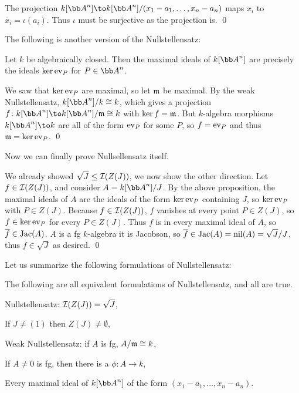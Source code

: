     The projection $k[\bA^n]\to k[\bA^n]/(x_1-a_1,\dots,x_n-a_n)$ maps $x_i$ to $\bar x_i=\iota(a_i)$.
    Thus $\iota$ must be surjective as the projection is.
    \qed

\eproof

The following is another version of the Nullstellensatz:

\bprop

    Let $k$ be algebraically closed.
    Then the maximal ideals of $k[\bA^n]$ are precisely the ideals $\mathop{\rm ker}{\rm ev}_P$ for $P\in\bA^n$.

\eprop

\bproof

    We saw that $\mathop{\rm ker}{\rm ev}_P$ are maximal, so let ${{\frak m}}$ be maximal.
    By the weak Nullstellensatz, $k[\bA^n]/k\cong k$, which gives a projection $f\colon k[\bA^n]\to k[\bA^n]/\m\cong k$ with
    $\mathop{\rm ker} f={{\frak m}}$.
    But $k$-algebra morphisms $k[\bA^n]\to k$ are all of the form ${\rm ev}_P$ for some $P$, so $f={\rm ev}_P$ and thus ${{\frak m}}=\mathop{\rm ker}{\rm ev}_P$.
    \qed

\eproof

Now we can finally prove Nullsellensatz itself.

\bproof[Nullstellensatz]

    We already showed $\sqrt J\leq{{\cal I}}(Z(J))$, we now show the other direction.
    Let $f\in{{\cal I}}(Z(J))$, and consider $A=k[\bA^n]/J$.
    By the above proposition, the maximal ideals of $A$ are the ideals of the form $\mathop{\rm ker}{\rm ev}_P$ containing $J$, so $\mathop{\rm ker}{\rm ev}_P$ with $P\in Z(J)$.
    Because $f\in{{\cal I}}(Z(J))$, $f$ vanishes at every point $P\in Z(J)$, so $f\in\mathop{\rm ker}{\rm ev}_P$ for every $P\in Z(J)$.
    Thus $f$ is in every maximal ideal of $A$, so ${\overline{f}}\in{\rm Jac}(A)$.
    $A$ is a fg $k$-algebra it is Jacobson, so ${\overline{f}}\in{\rm Jac}(A)={\rm nil}(A)=\sqrt J/J$, thus $f\in\sqrt J$ as desired.
    \qed

\eproof

Let us summarize the following formulations of Nullstellensatz:

\bthrm[title=Equivalent formulations of Nullstellensatz]

    The following are all equivalent formulations of Nullstellensatz, and all are true.
    \benum
        \item Nullstellensatz: ${{\cal I}}(Z(J))=\sqrt J$,
        \item If $J\neq(1)$ then $Z(J)\neq\emptyset$,
        \item Weak Nullstellensatz: if $A$ is fg, $A/{{\frak m}}\cong k$,
        \item If $A\neq0$ is fg, then there is a $\phi\colon A\to k$,
        \item Every maximal ideal of $k[\bA^n]$ of the form $(x_1-a_1,\dots,x_n-a_n)$.
    \eenum

